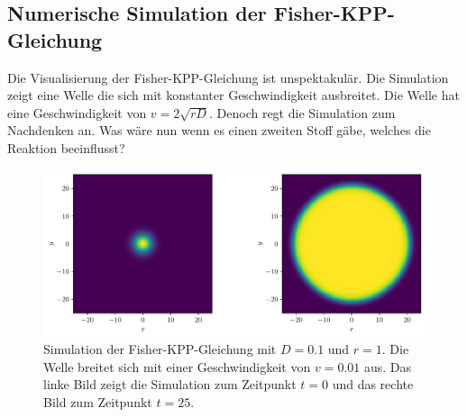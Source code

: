 \subsection{Numerische Simulation der Fisher-KPP-Gleichung
\label{reaktdiff:subsection:fkppsimulation}}
Die Visualisierung der Fisher-KPP-Gleichung ist unspektakulär.
Die Simulation zeigt eine Welle die sich mit konstanter Geschwindigkeit ausbreitet.
Die Welle hat eine Geschwindigkeit von \(v = 2\sqrt{rD}\).
Denoch regt die Simulation zum Nachdenken an.
Was wäre nun wenn es einen zweiten Stoff gäbe, welches die Reaktion beeinflusst?
\begin{figure}
    \centering
    \includegraphics[width=\textwidth]{papers/reaktdiff/images/Fisher_KPP/fisher_kpp_2d_wave_comparison.pdf}
    \caption{Simulation der Fisher-KPP-Gleichung mit \(D = 0.1\) und \(r = 1\). Die Welle breitet sich mit einer Geschwindigkeit von \(v = 0.01\) aus. Das linke Bild zeigt die Simulation zum Zeitpunkt \(t = 0\) und das rechte Bild zum Zeitpunkt \(t = 25\).}
    \label{reaktdiff:figure:fisher_kpp_simulation}
\end{figure}